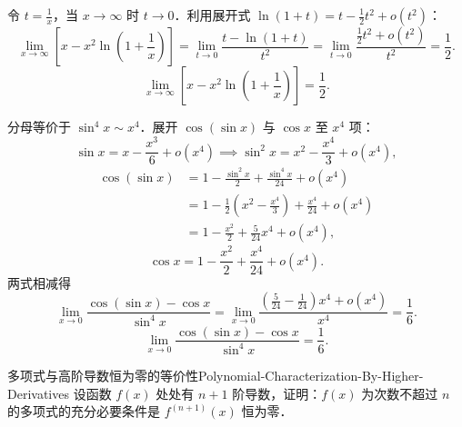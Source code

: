 \begin{solution}

    令 $t = \frac{1}{x}$，当 $x \to \infty$ 时 $t \to 0$．利用展开式 $\ln(1+t) = t - \frac{1}{2}t^2 + o(t^2)$：
    \begin{equation}
        \lim_{x\to\infty} \left[ x - x^2 \ln\left(1 + \frac{1}{x}\right) \right] = \lim_{t\to 0} \frac{t - \ln(1+t)}{t^2} = \lim_{t\to 0} \frac{\frac{1}{2}t^2 + o(t^2)}{t^2} = \frac{1}{2}.
    \end{equation}
    \begin{equation}
        \boxed{\lim_{x\to\infty} \left[ x - x^2 \ln\left(1 + \frac{1}{x}\right) \right] = \frac{1}{2}.}
    \end{equation}


    分母等价于 $\sin^4 x \sim x^4$．展开 $\cos(\sin x)$ 与 $\cos x$ 至 $x^4$ 项：
    \begin{equation}
        \sin x = x - \frac{x^3}{6} + o(x^4) \implies \sin^2 x = x^2 - \frac{x^4}{3} + o(x^4),
    \end{equation}
    \begin{equation}
        \begin{aligned}
            \cos(\sin x) & = 1 - \frac{\sin^2 x}{2} + \frac{\sin^4 x}{24} + o(x^4)                       \\
                         & = 1 - \frac{1}{2}\left( x^2 - \frac{x^4}{3} \right) + \frac{x^4}{24} + o(x^4) \\
                         & = 1 - \frac{x^2}{2} + \frac{5}{24}x^4 + o(x^4),
        \end{aligned}
    \end{equation}
    \begin{equation}
        \cos x = 1 - \frac{x^2}{2} + \frac{x^4}{24} + o(x^4).
    \end{equation}
    两式相减得
    \begin{equation}
        \lim_{x\to 0} \frac{\cos(\sin x) - \cos x}{\sin^4 x} = \lim_{x\to 0} \frac{\left( \frac{5}{24} - \frac{1}{24} \right)x^4 + o(x^4)}{x^4} = \frac{1}{6}.
    \end{equation}
    \begin{equation}
        \boxed{\lim_{x\to 0} \frac{\cos(\sin x) - \cos x}{\sin^4 x} = \frac{1}{6}.}
    \end{equation}
\end{solution}

\begin{problem}{多项式与高阶导数恒为零的等价性}{Polynomial-Characterization-By-Higher-Derivatives}
    设函数 $f(x)$ 处处有 $n+1$ 阶导数，证明：$f(x)$ 为次数不超过 $n$ 的多项式的充分必要条件是 $f^{(n+1)}(x)$ 恒为零．
\end{problem}

